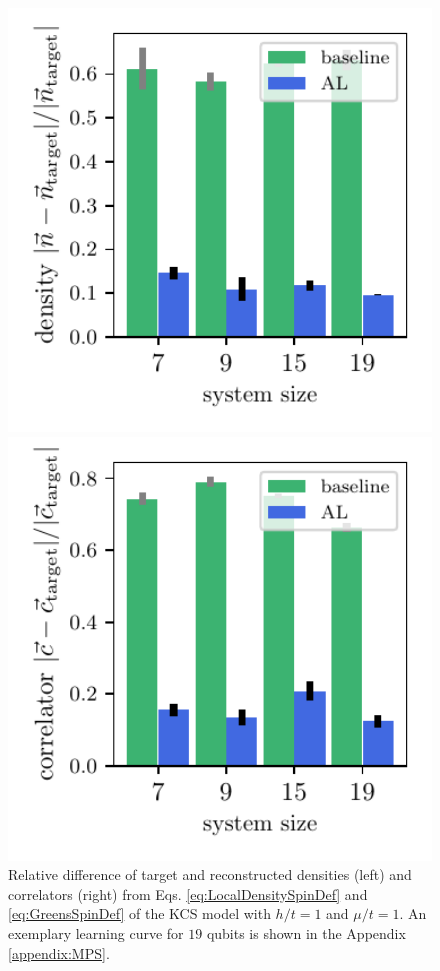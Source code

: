 \documentclass[pra,aps,showpacs,groupedaddress,superscriptaddress,twocolumn,toc=flat,biblatex,footinbib]{revtex4-1}
\begin{document}
\begin{figure}[t]
	\centering
\begin{minipage}[t]{0.23\textwidth}
   \includegraphics[width=1\textwidth]{Fig10a.pdf}
\end{minipage}
\begin{minipage}[t]{0.23\textwidth}
   \includegraphics[width=1\textwidth]{Fig10b.pdf}
\end{minipage}
	\caption[]{Relative difference of target and reconstructed densities (left) and correlators (right) from Eqs. \eqref{eq:LocalDensitySpinDef} and \eqref{eq:GreensSpinDef} of the KCS model with $h/t=1$ and $\mu/t=1$. An exemplary learning curve for $19$ qubits is shown in the Appendix \ref{appendix:MPS}.}
	\label{fig:LGT_h=1}
\end{figure}
\end{document}
